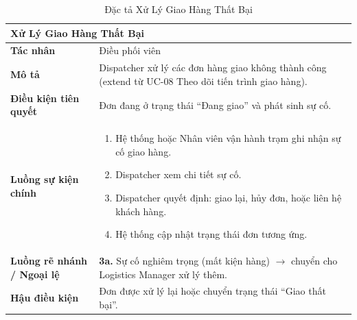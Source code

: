 \begin{table}[H]
  \centering
  \begin{tabularx}{\textwidth}{|l|X|}
    \hline
    \multicolumn{2}{|l|}{\textbf{Xử Lý Giao Hàng Thất Bại}} \\
    \hline
    \textbf{Tác nhân}           & Điều phối viên \\ \hline
    \textbf{Mô tả}              & Dispatcher xử lý các đơn hàng giao không thành công (extend từ UC-08 Theo dõi tiến trình giao hàng). \\ \hline
    \textbf{Điều kiện tiên quyết} & Đơn đang ở trạng thái ``Đang giao'' và phát sinh sự cố. \\ \hline
    \textbf{Luồng sự kiện chính} &
      \begin{enumerate}[leftmargin=*, nosep, topsep=0pt]
        \item Hệ thống hoặc Nhân viên vận hành trạm ghi nhận sự cố giao hàng.
        \item Dispatcher xem chi tiết sự cố.
        \item Dispatcher quyết định: giao lại, hủy đơn, hoặc liên hệ khách hàng.
        \item Hệ thống cập nhật trạng thái đơn tương ứng.
      \end{enumerate} \\ \hline
    \textbf{Luồng rẽ nhánh / Ngoại lệ} &
      \textbf{3a.} Sự cố nghiêm trọng (mất kiện hàng) $\rightarrow$ chuyển cho Logistics Manager xử lý thêm. \\ \hline
    \textbf{Hậu điều kiện}      & Đơn được xử lý lại hoặc chuyển trạng thái ``Giao thất bại''. \\
    \hline
  \end{tabularx}
  \caption{Đặc tả Xử Lý Giao Hàng Thất Bại}
  \label{tab:uc06}
\end{table}


